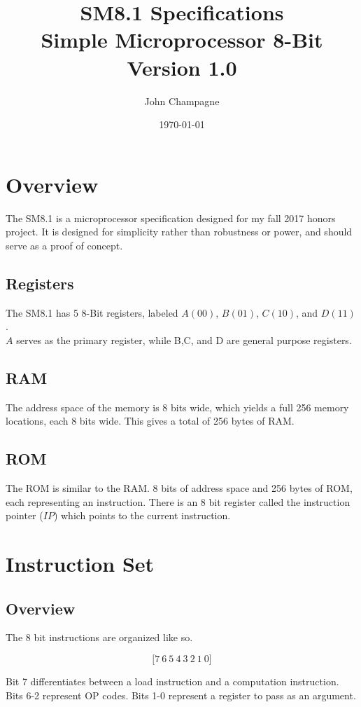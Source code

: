 \documentclass[11pt]{article}
\title{\textbf{SM8.1 Specifications}\\Simple Microprocessor 8-Bit\\Version 1.0}
\author{John Champagne}
\date{\today}
\begin{document}
\maketitle
\section{Overview}
The SM8.1 is a microprocessor specification designed for my fall 2017 honors project. It is designed for simplicity rather than robustness or power, and should serve as a proof of concept.
\subsection{Registers}
The SM8.1 has 5 8-Bit registers, labeled $A (00)$, $B(01)$, $C(10)$, and $D(11)$.\\
$A$ serves as the primary register, while B,C, and D are general purpose registers.
\subsection{RAM}
The address space of the memory is 8 bits wide, which yields a full 256 memory locations, each 8 bits wide. This gives a total of 256 bytes of RAM.
\subsection{ROM}
The ROM is similar to the RAM. 8 bits of address space and 256 bytes of ROM, each representing an instruction. There is an 8 bit register called the instruction pointer ($IP$) which points to the current instruction.
\newpage
\section{Instruction Set}
\subsection{Overview}
The 8 bit instructions are organized like so.

$$\big[7\ 6\ 5\ 4\ 3\ 2\ 1\ 0\big]$$

Bit 7 differentiates between a load instruction and a computation instruction. Bits 6-2 represent OP codes. Bits 1-0 represent a register to pass as an argument.
\end{document}
